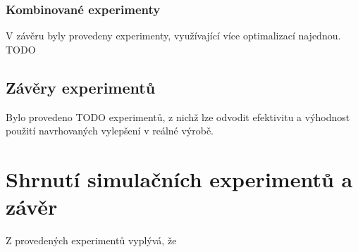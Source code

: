 \documentclass[11pt, a4paper]{article}
\begin{document}
\subsubsection{Kombinované experimenty}
V závěru byly provedeny experimenty, využívající více optimalizací najednou. TODO

\subsection{Závěry experimentů}
Bylo provedeno TODO experimentů, z nichž lze odvodit efektivitu a výhodnost použití navrhovaných vylepšení v reálné výrobě.

\section{Shrnutí simulačních experimentů a závěr}
Z provedených experimentů vyplývá, že



\end{document}
